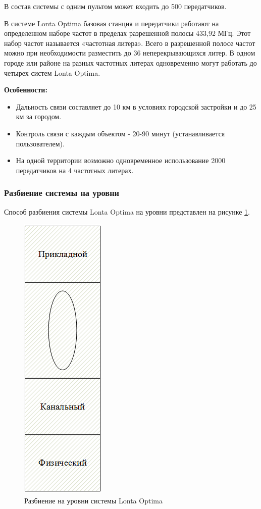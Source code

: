 В состав системы с одним пультом может входить до 500 передатчиков.

В системе Lonta Optima базовая станция и передатчики работают на определенном наборе частот в пределах разрешенной полосы 433,92 МГц. Этот набор частот называется «частотная литера». Всего в разрешенной полосе частот можно при необходимости разместить до 36 неперекрывающихся литер.
В одном городе или районе на разных частотных литерах одновременно могут работать до четырех систем Lonta Optima.

\textbf{Особенности:}
\begin{itemize}

\item Дальность связи составляет до 10 км в условиях городской застройки и до 25 км за городом.
\item Контроль связи с каждым объектом - 20-90 минут (устанавливается пользователем).
\item На одной территории возможно одновременное использование 2000 передатчиков на 4 частотных литерах.
\end{itemize}

\subsubsection{Разбиение системы на уровни}
Способ разбиения системы  Lonta Optima на уровни представлен на рисунке
\ref{fig:system_levels}.
\begin{figure}[h]
	\centering\includegraphics[width=0.2\linewidth]{img/system_levels}
	\caption{Разбиение на уровни системы Lonta Optima}
	\label{fig:system_levels}
\end{figure}

